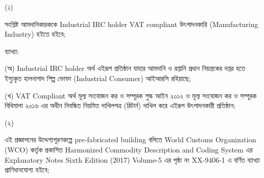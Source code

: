 \documentclass[12pt]{article}
\begin{document}
\begin{minipage}[t]{0.05\linewidth}
\hspace{1em}
\end{minipage}
\begin{minipage}[t]{0.05\linewidth}
(১)
\end{minipage}
\begin{minipage}[t]{0.9\linewidth}
 সংশ্লিষ্ট আমদানিকারককে
 Industrial IRC holder VAT compliant
 উৎপাদনকারি (Manufacturing Industry) হইতে
 হইবে;
 \\
\end{minipage}
\begin{minipage}[t]{0.1\linewidth}
\hspace{1em}
\end{minipage}
\begin{minipage}[t]{0.9\linewidth}
ব্যাখ্যা:
 \\
\end{minipage}
\begin{minipage}[t]{0.1\linewidth}
\hspace{1em}
\end{minipage}
\begin{minipage}[t]{0.9\linewidth}
(অ) Industrial IRC holder অর্থ
এইরূপ প্রতিষ্ঠান যাহার আমদানি ও রপ্তানি
প্রধান নিয়ন্ত্রকের দপ্তর হতে ইস্যুকৃত হালনাগাদ
শিল্প ভোক্তা (Industrial Consumer) আইআরসি
রহিয়াছে;
\\
\end{minipage}
\begin{minipage}[t]{0.1\linewidth}
\hspace{1em}
\end{minipage}
\begin{minipage}[t]{0.9\linewidth}
(খ) VAT Compliant অর্থ মূল্য
সংযোজন কর ও সম্পূরক শুল্ক আইন ২০১২
ও মূল্য সংযোজন কর ও সম্পূরক বিধিমালা ২০১৬
এর অধীন নিবন্ধিত নিয়মিত দাখিলপত্র (রিটার্ন) দাখিল
করে এইরূপ উৎপাদনকারী প্রতিষ্ঠান;
\\
\end{minipage}
\begin{minipage}[t]{0.05\linewidth}
\hspace{1em}
\end{minipage}
\begin{minipage}[t]{0.05\linewidth}
(২)
\end{minipage}
\begin{minipage}[t]{0.9\linewidth}
এই প্রজ্ঞাপনের উদ্দেশ্যপূরণকল্পে
pre-fabricated building বলিতে
World Customs Organization (WCO) কর্তৃক
প্রকাশিত Harmonized Commodity Description
and Coding System এর Explanatory Notes
Sixth Edition (2017) Volume-5 এর পৃষ্ঠা নং
XX-9406-1 এ বর্ণিত ব্যাখ্যা প্রাণিধানযোগ্য হইবে;
\\
\end{minipage}
\end{document}
